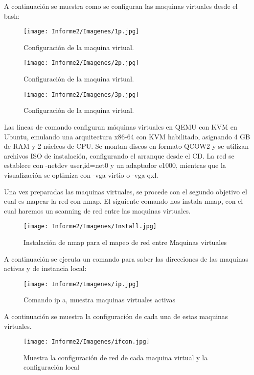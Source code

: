 \documentclass[conference]{IEEEtran}
\begin{document}
A continuación se muestra como se configuran las maquinas virtuales desde el bash:


\begin{figure}[h!]
\centering
\texttt{[image: Informe2/Imagenes/1p.jpg]}
\caption{Configuración de la maquina virtual.}
\end{figure}

\begin{figure}[h!]
\centering
\texttt{[image: Informe2/Imagenes/2p.jpg]}
\caption{Configuración de la maquina virtual.}
\end{figure}

\begin{figure}[h!]
\centering
\texttt{[image: Informe2/Imagenes/3p.jpg]}
\caption{Configuración de la maquina virtual.}
\end{figure}

Las líneas de comando configuran máquinas virtuales en QEMU con KVM en Ubuntu, emulando una arquitectura x86-64 con KVM habilitado, asignando 4 GB de RAM y 2 núcleos de CPU. Se montan discos en formato QCOW2 y se utilizan archivos ISO de instalación, configurando el arranque desde el CD. La red se establece con -netdev user,id=net0 y un adaptador e1000, mientras que la visualización se optimiza con -vga virtio o -vga qxl.

Una vez preparadas las maquinas virtuales, se procede con el segundo objetivo el cual es mapear la red con nmap. 
El siguiente comando nos instala nmap, con el cual haremos un scanning de red entre las maquinas virtuales.

\begin{figure}[h!]
\centering
\texttt{[image: Informe2/Imagenes/Install.jpg]}
\caption{Instalación de nmap para el mapeo de red entre Maquinas virtuales}
\end{figure}

A continuación se ejecuta un comando para saber las direcciones de las maquinas activas y de instancia local:

\begin{figure}[h!]
\centering
\texttt{[image: Informe2/Imagenes/ip.jpg]}
\caption{Comando ip a, muestra maquinas virtuales activas}
\end{figure}

A continuación se muestra la configuración de cada una de estas maquinas virtuales.

\begin{figure}[h!]
\centering
\texttt{[image: Informe2/Imagenes/ifcon.jpg]}
\caption{Muestra la configuración de red de cada maquina virtual y la configuración local }
\end{figure}
\end{document}
